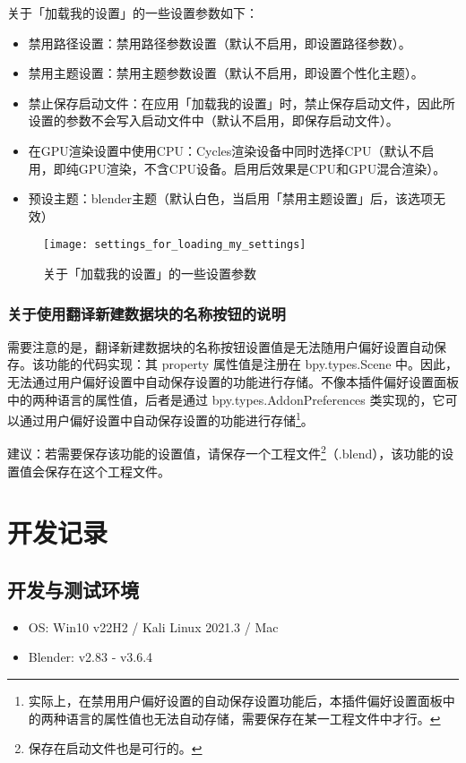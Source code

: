 \documentclass{../../public_resources/doc}
\begin{document}
关于「加载我的设置」的一些设置参数如下：
\hypertarget{加载我的设置小节}{}
\begin{itemize}
    \item 禁用路径设置：禁用路径参数设置（默认不启用，即设置路径参数）。
    \item 禁用主题设置：禁用主题参数设置（默认不启用，即设置个性化主题）。
    \item 禁止保存启动文件：在应用「加载我的设置」时，禁止保存启动文件，因此所设置的参数不会写入启动文件中（默认不启用，即保存启动文件）。
    \item 在GPU渲染设置中使用CPU：Cycles渲染设备中同时选择CPU（默认不启用，即纯GPU渲染，不含CPU设备。启用后效果是CPU和GPU混合渲染）。
    \item 预设主题：blender主题（默认白色，当启用「禁用主题设置」后，该选项无效）
\end{itemize}

\begin{figure}[h!]
    \texttt{[image: settings\_for\_loading\_my\_settings]}
    \caption{关于「加载我的设置」的一些设置参数}
    \label{加载我的设置的设置参数}
\end{figure}

\subsubsection{关于使用翻译新建数据块的名称按钮的说明}
需要注意的是，翻译新建数据块的名称按钮设置值是无法随用户偏好设置自动保存。该功能的代码实现：其 property 属性值是注册在 bpy.types.Scene 中。因此，无法通过用户偏好设置中自动保存设置的功能进行存储。不像本插件偏好设置面板中的两种语言的属性值，后者是通过 bpy.types.AddonPreferences 类实现的，它可以通过用户偏好设置中自动保存设置的功能进行存储\footnote{实际上，在禁用用户偏好设置的自动保存设置功能后，本插件偏好设置面板中的两种语言的属性值也无法自动存储，需要保存在某一工程文件中才行。}。

建议：若需要保存该功能的设置值，请保存一个工程文件\footnote{保存在启动文件也是可行的。}（.blend），该功能的设置值会保存在这个工程文件。

\section{开发记录}
\subsection{开发与测试环境}
\begin{itemize}
    \item OS: Win10 v22H2 / Kali Linux 2021.3 / Mac
    \item Blender: v2.83 ‑ v3.6.4
\end{itemize}
\end{document}
